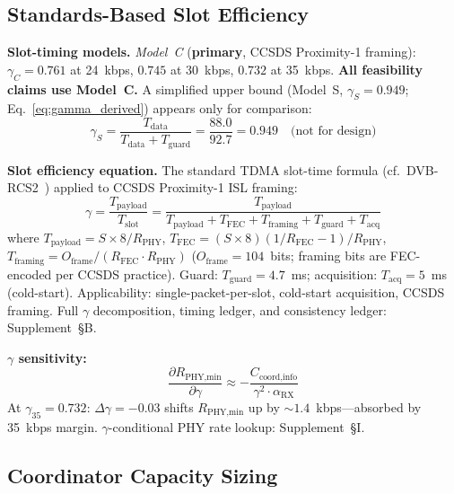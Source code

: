 \documentclass[journal]{IEEEtran}
\begin{document}
\subsection{Standards-Based Slot Efficiency}
\label{sec:packet_derivation}

\textbf{Slot-timing models.} \emph{Model~C} (\textbf{primary}, CCSDS Proximity-1 framing): $\gamma_C = 0.761$ at 24~kbps, $0.745$ at 30~kbps, $0.732$ at 35~kbps. \textbf{All feasibility claims use Model~C.} A simplified upper bound (Model~S, $\gamma_S = 0.949$; Eq.~\ref{eq:gamma_derived}) appears only for comparison:
\begin{equation}
    \gamma_S = \frac{T_{\text{data}}}{T_{\text{data}} + T_{\text{guard}}} = \frac{88.0}{92.7} = 0.949 \quad \text{(not for design)}
    \label{eq:gamma_derived}
\end{equation}

\textbf{Slot efficiency equation.} The standard TDMA slot-time formula (cf.\ DVB-RCS2~\cite{dvb_rcs2}) applied to CCSDS Proximity-1 ISL framing:
\begin{equation}
    \gamma = \frac{T_{\text{payload}}}{T_{\text{slot}}} = \frac{T_{\text{payload}}}{T_{\text{payload}} + T_{\text{FEC}} + T_{\text{framing}} + T_{\text{guard}} + T_{\text{acq}}}
    \label{eq:gamma_time}
\end{equation}
where $T_{\text{payload}} = S \times 8 / R_{\text{PHY}}$, $T_{\text{FEC}} = (S \times 8)(1/R_{\text{FEC}} - 1) / R_{\text{PHY}}$, $T_{\text{framing}} = O_{\text{frame}} / (R_{\text{FEC}} \cdot R_{\text{PHY}})$ ($O_{\text{frame}} = 104$~bits; framing bits are FEC-encoded per CCSDS practice). Guard: $T_{\text{guard}} = 4.7$~ms; acquisition: $T_{\text{acq}} = 5$~ms (cold-start). Applicability: single-packet-per-slot, cold-start acquisition, CCSDS framing. Full $\gamma$ decomposition, timing ledger, and consistency ledger: Supplement~\S B.

\textbf{$\gamma$ sensitivity:}
\begin{equation}
    \frac{\partial R_{\text{PHY,min}}}{\partial \gamma} \approx -\frac{C_{\text{coord,info}}}{\gamma^2 \cdot \alpha_{\text{RX}}}
    \label{eq:dR_dgamma}
\end{equation}
At $\gamma_{35} = 0.732$: $\Delta\gamma = -0.03$ shifts $R_{\text{PHY,min}}$ up by ${\sim}1.4$~kbps---absorbed by 35~kbps margin. $\gamma$-conditional PHY rate lookup: Supplement~\S I.

\subsection{Coordinator Capacity Sizing}
\label{sec:coordinator_bandwidth}
\end{document}
